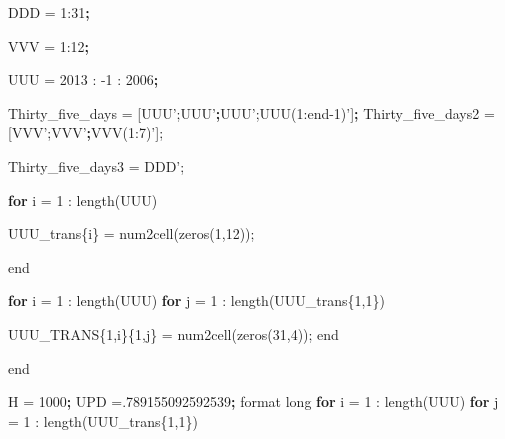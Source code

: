 \documentclass[
]{article}
\newenvironment{Shaded}{\begin{snugshade}}{\end{snugshade}}
\newcommand{\DataTypeTok}[1]{\textcolor[rgb]{0.13,0.29,0.53}{#1}}
\newcommand{\ExtensionTok}[1]{#1}
\newcommand{\KeywordTok}[1]{\textcolor[rgb]{0.13,0.29,0.53}{\textbf{#1}}}
\newcommand{\NormalTok}[1]{#1}
\newcommand{\StringTok}[1]{\textcolor[rgb]{0.31,0.60,0.02}{#1}}
\begin{document}
\begin{Shaded}
\begin{Highlighting}[]

\ExtensionTok{%
\ExtensionTok{%

\ExtensionTok{DDD}\NormalTok{ = 1:31}\KeywordTok{;}

\ExtensionTok{%

\ExtensionTok{VVV}\NormalTok{ = 1:12}\KeywordTok{;}

\ExtensionTok{%

\ExtensionTok{UUU}\NormalTok{ = 2013 : -1 : 2006}\KeywordTok{;}

\ExtensionTok{%
\ExtensionTok{%
\ExtensionTok{Thirty_five_days}\NormalTok{ = [UUU}\StringTok{';UUU'}\KeywordTok{;}\ExtensionTok{UUU}\StringTok{';UUU(1:end-1)'}\NormalTok{]}\KeywordTok{;}
\ExtensionTok{%
\ExtensionTok{Thirty_five_days2}\NormalTok{ = [VVV}\StringTok{';VVV'}\KeywordTok{;}\ExtensionTok{VVV}\NormalTok{(1:7)}\StringTok{'];}
\StringTok{%
\StringTok{Thirty_five_days3 = DDD'}\NormalTok{;}

\ExtensionTok{%

\ExtensionTok{%
\KeywordTok{for} \ExtensionTok{i}\NormalTok{ = 1 : length(UUU)}
    
    \ExtensionTok{UUU_trans}\DataTypeTok{\{i\}}\NormalTok{ = num2cell(zeros(1,12));}
    
\ExtensionTok{end}

\KeywordTok{for} \ExtensionTok{i}\NormalTok{ = 1 : length(UUU)}
    \KeywordTok{for} \ExtensionTok{j}\NormalTok{ = 1 : length(UUU_trans}\DataTypeTok{\{1,1\}}\NormalTok{)}
        
        \ExtensionTok{UUU_TRANS}\DataTypeTok{\{1,i\}\{1,j\}}\NormalTok{ = num2cell(zeros(31,4));}
    \ExtensionTok{end}
    
\ExtensionTok{end}

\ExtensionTok{%
\ExtensionTok{H}\NormalTok{ = 1000}\KeywordTok{;}
\ExtensionTok{UPD}\NormalTok{ =.789155092592539}\KeywordTok{;}
\ExtensionTok{format}\NormalTok{ long}
\ExtensionTok{%
\KeywordTok{for} \ExtensionTok{i}\NormalTok{ = 1 : length(UUU)}
    \KeywordTok{for} \ExtensionTok{j}\NormalTok{ = 1 : length(UUU_trans}\DataTypeTok{\{1,1\}}\NormalTok{)}
        
}}}}}}}}}}}}
\end{Highlighting}
\end{Shaded}
\end{document}
